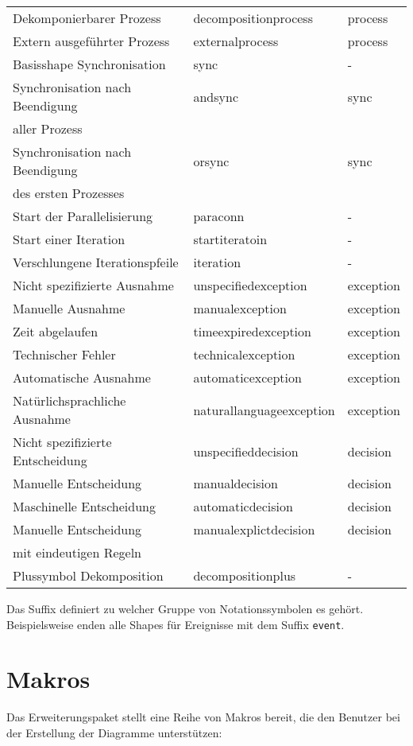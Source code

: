 \documentclass[12pt, a4paper]{article}
\begin{document}
\begin{longtable}{lll}
        Dekomponierbarer Prozess & decompositionprocess & process \\
        Extern ausgeführter Prozess & externalprocess & process \\
        Basisshape Synchronisation & sync & - \\
        Synchronisation nach Beendigung & andsync & sync \\
        aller Prozess & & \\
        Synchronisation nach Beendigung & orsync & sync \\
        des ersten Prozesses & & \\
        Start der Parallelisierung & paraconn & - \\
        Start einer Iteration & startiteratoin & - \\
        Verschlungene Iterationspfeile & iteration & - \\
        Nicht spezifizierte Ausnahme & unspecifiedexception & exception \\
        Manuelle Ausnahme & manualexception & exception \\
        Zeit abgelaufen & timeexpiredexception & exception \\
        Technischer Fehler & technicalexception & exception \\
        Automatische Ausnahme & automaticexception & exception \\
        Natürlichsprachliche Ausnahme & naturallanguageexception & exception \\
        Nicht spezifizierte Entscheidung & unspecifieddecision & decision \\
        Manuelle Entscheidung & manualdecision & decision \\
        Maschinelle Entscheidung & automaticdecision & decision \\
        Manuelle Entscheidung & manualexplictdecision & decision \\
        mit eindeutigen Regeln & & \\
        Plussymbol Dekomposition & decompositionplus & - \\
        \bottomrule    
\end{longtable}
\noindent Das Suffix definiert zu welcher Gruppe von Notationssymbolen es gehört. Beispielsweise enden alle Shapes für Ereignisse mit dem Suffix \texttt{event}.\newpage

\section{Makros}
\label{sec:Makros}
Das Erweiterungspaket stellt eine Reihe von Makros bereit, die den Benutzer bei der Erstellung der Diagramme unterstützen:\medskip
\end{document}
